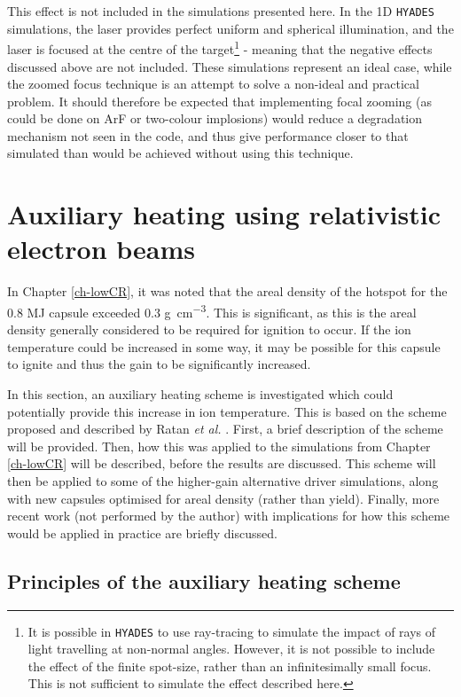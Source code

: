 This effect is not included in the simulations presented here. In the 1D \texttt{HYADES} simulations, the laser provides perfect uniform and spherical illumination, and the laser is focused at the centre of the target\footnote{It is possible in \texttt{HYADES} to use ray-tracing to simulate the impact of rays of light travelling at non-normal angles. However, it is not possible to include the effect of the finite spot-size, rather than an infinitesimally small focus. This is not sufficient to simulate the effect described here.} - meaning that the negative effects discussed above are not included. These simulations represent an ideal case, while the zoomed focus technique is an attempt to solve a non-ideal and practical problem. It should therefore be expected that implementing focal zooming (as could be done on ArF or two-colour implosions) would reduce a degradation mechanism not seen in the code, and thus give performance closer to that simulated than would be achieved without using this technique.

\section{Auxiliary heating using relativistic electron beams} \label{sec:AuxiliaryHeating}

In Chapter \ref{ch-lowCR}, it was noted that the areal density of the hotspot for the 0.8 MJ capsule exceeded 0.3 \unit{\gram\per\centi\meter\cubed}. This is significant, as this is the areal density generally considered to be required for ignition to occur. If the ion temperature could be increased in some way, it may be possible for this capsule to ignite and thus the gain to be significantly increased.

In this section, an auxiliary heating scheme is investigated which could potentially provide this increase in ion temperature. This is based on the scheme proposed and described by Ratan \textit{et al.} \cite{Ratan2017}. First, a brief description of the scheme will be provided. Then, how this was applied to the simulations from Chapter \ref{ch-lowCR} will be described, before the results are discussed. This scheme will then be applied to some of the higher-gain alternative driver simulations, along with new capsules optimised for areal density (rather than yield). Finally, more recent work (not performed by the author) with implications for how this scheme would be applied in practice are briefly discussed.

\subsection{Principles of the auxiliary heating scheme}

